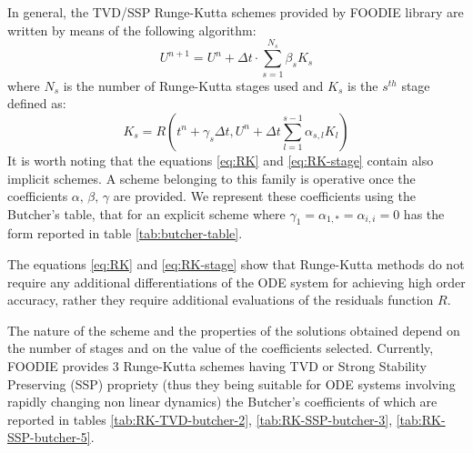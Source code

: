 In general, the TVD/SSP Runge-Kutta schemes provided by FOODIE library are written by means of the following algorithm:
\begin{equation}
  U^{n+1} = U^{n} + \Delta t \cdot\sum\limits_{s=1}^{N_{s}}{\beta_s K_s}
\label{eq:RK}
\end{equation}
where $N_s$ is the number of Runge-Kutta stages used and $K_s$ is the $s^{th}$ stage defined as:
\begin{equation}
  K_s = R\left(t^n + \gamma_s \Delta t, U^n+\Delta t\sum\limits_{l=1}^{s-1}{\alpha_{s,l} K_l} \right)
\label{eq:RK-stage}
\end{equation}
It is worth noting that the equations \ref{eq:RK} and \ref{eq:RK-stage} contain also implicit schemes. A scheme belonging to this family is operative once the coefficients $\alpha,\, \beta,\, \gamma$ are provided. We represent these coefficients using the Butcher's table, that for an explicit scheme where $\gamma_1=\alpha_{1,*}=\alpha_{i,i}=0$ has the form reported in table \ref{tab:butcher-table}.

\begin{table}[!ht]
\caption{Butcher's table for explicit Runge-Kutta schemes}\label{tab:butcher-table}
\centering
{}
\end{table}

The equations \ref{eq:RK} and \ref{eq:RK-stage} show that Runge-Kutta methods do not require any additional differentiations of the ODE system for achieving high order accuracy, rather they require additional evaluations of the residuals function $R$.

The nature of the scheme and the properties of the solutions obtained depend on the number of stages and on the value of the coefficients selected. Currently, FOODIE provides 3 Runge-Kutta schemes having TVD or Strong Stability Preserving (SSP) propriety (thus they being suitable for ODE systems involving rapidly changing non linear dynamics) the Butcher's coefficients of which are reported in tables \ref{tab:RK-TVD-butcher-2}, \ref{tab:RK-SSP-butcher-3}, \ref{tab:RK-SSP-butcher-5}.

